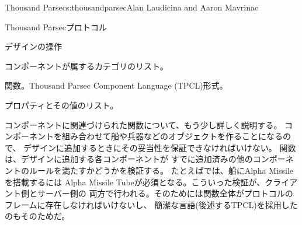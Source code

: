 \begin{aosachapter}{Thousand Parsec}{s:thousandparsec}{Alan Laudicina and Aaron Mavrinac}
\begin{aosasect1}{Thousand Parsecプロトコル}
\begin{aosasect2}{デザインの操作}
\begin{aosaitemize}
  \item コンポーネントが属するカテゴリのリスト。

  \item {}関数。Thousand Parsec Component Language (TPCL)形式。

  \item プロパティとその値のリスト。

\end{aosaitemize}

コンポーネントに関連づけられた関数について、もう少し詳しく説明する。
コンポーネントを組み合わせて船や兵器などのオブジェクトを作ることになるので、
デザインに追加するときにその妥当性を保証できなければいけない。
関数は、デザインに追加する各コンポーネントが
すでに追加済みの他のコンポーネントのルールを満たすかどうかを検証する。
たとえばでは、船にAlpha Missileを搭載するには
Alpha Missile Tubeが必須となる。こういった検証が、クライアント側とサーバー側の
両方で行われる。そのためには関数全体がプロトコルのフレームに存在しなければいけないし、
簡潔な言語(後述するTPCL)を採用したのもそのためだ。


\end{aosasect2}
\end{aosasect1}
\end{aosachapter}
